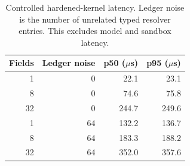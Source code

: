 \begin{table}[t]
\centering
\small
\caption{Controlled hardened-kernel latency. Ledger noise is the number of unrelated typed resolver entries. This excludes model and sandbox latency.}
\label{tab:e83-kernel-overhead}
\begin{tabular}{rrrr}
\toprule
Fields & Ledger noise & p50 ($\mu$s) & p95 ($\mu$s) \\
\midrule
1 & 0 & 22.1 & 23.1 \\
8 & 0 & 74.6 & 75.8 \\
32 & 0 & 244.7 & 249.6 \\
1 & 64 & 132.2 & 136.7 \\
8 & 64 & 183.3 & 188.2 \\
32 & 64 & 352.0 & 357.6 \\
\bottomrule
\end{tabular}
\end{table}
